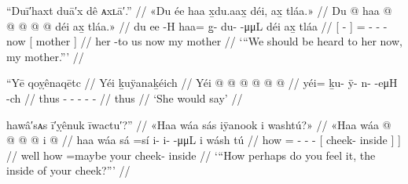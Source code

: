 

\ex\label{ex:92-50-should-be-heard-to-her}%
%
\begingl
	\glpreamble	“Duī′haxt duā′x dê ᴀxʟā′.” //
	\glpreamble	«\!Du ée haa x̱du.aax̱ déi, ax̱ tláa.\!» //
	\gla	{} Du  @ {} {}
		haa @  @ {} @ {} @ {} @ {}
		déi
		{} ax̱ tláa.\!» {} //
	\glb	{} du ee -H {}
		haa= {} g̱- du-  -μμL
		déi
		{} ax̱ tláa {} //
	\glc	{}[   - {}]
		= \· - -  -
		now
		{}[  mother {}] //
	\gld	{} her {} -to {}
		us  {} {} {} {}
		now
		{} my mother {} //
	\glft	‘“We should be heard to her now, my mother.”’
		//
\endgl
\xe


\ex\label{ex:92-51-she-said}%
%
\begingl
	\glpreamble	“Yē qoỵênaqētc //
	\glpreamble	Yéi ḵuÿanaḵéich //
	\gla	Yéi @  @ {} @ {} @ {} @ {} @ {} //
	\glb	yéi= ḵu- ÿ- n-  -eμH -ch //
	\glc	thus - - -  - - //
	\gld	thus  {} {} {} {} {} //
	\glft	‘She would say’
		//
\endgl
\xe

\ex\label{ex:92-52-how-does-it-feel-cheek-inside}%
%
\begingl
	\glpreamble	hawâ′sᴀs ī′ỵênuk īwactu′?” //
	\glpreamble	«\!Haa wáa sás iÿanook i washtú?\!» //
	\gla	«\!Haa wáa  @ {}
			 @ {} @ {} @ {}
			{} i  @ {} {} {} //
	\glb	\pqp{}haa wáa sá =sí
			i- i-  -μμL
			{} i wásh tú {} {} //
	\glc	\pqp{} how  =
			- -  -
			{}[  cheek- inside {}] {}] //
	\gld	\pqp{}well how  =maybe
			 {} {} {}
			{} your cheek- inside {} {} //
	\glft	‘“How perhaps do you feel it, the inside of your cheek?”’
		//
\endgl
\xe


